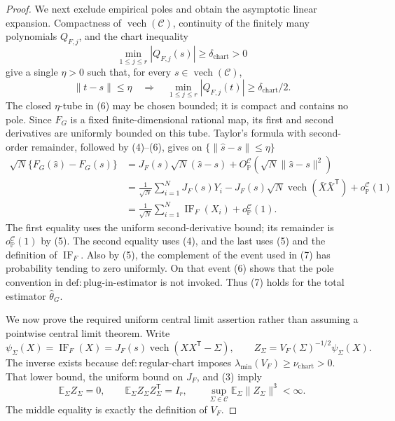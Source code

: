 \documentclass{article}
\begin{document}
\begin{proof}
We next exclude empirical poles and obtain the asymptotic linear expansion.  Compactness of \(\operatorname{vech}(\mathcal C)\), continuity of the finitely many polynomials \(Q_{F,j}\), and the chart inequality
\[
 \min_{1\le j\le r}|Q_{F,j}(s)|\ge\delta_{\mathrm{chart}}>0
\]
give a single \(\eta>0\) such that, for every \(s\in\operatorname{vech}(\mathcal C)\),
\[
 \lVert t-s\rVert\le\eta
 \quad\Longrightarrow\quad
 \min_{1\le j\le r}|Q_{F,j}(t)|\ge\delta_{\mathrm{chart}}/2.
\tag{6}
\]
The closed \(\eta\)-tube in (6) may be chosen bounded; it is compact and contains no pole.  Since \(F_G\) is a fixed finite-dimensional rational map, its first and second derivatives are uniformly bounded on this tube.  Taylor's formula with second-order remainder, followed by (4)--(6), gives on \(\{\lVert\widehat s-s\rVert\le\eta\}\)
\[
\begin{aligned}
 \sqrt N\{F_G(\widehat s)-F_G(s)\}
 &=J_F(s)\sqrt N(\widehat s-s)
   +O_{\mathbb P}^{\mathcal C}\!\left(\sqrt N\lVert\widehat s-s\rVert^2\right)\\
 &=\frac1{\sqrt N}\sum_{i=1}^N J_F(s)Y_i
   -J_F(s)\sqrt N\operatorname{vech}(\bar X\bar X^{\mathsf T})
   +o_{\mathbb P}^{\mathcal C}(1)\\
 &=\frac1{\sqrt N}\sum_{i=1}^N\operatorname{IF}_F(X_i)
   +o_{\mathbb P}^{\mathcal C}(1).
\end{aligned}
\tag{7}
\]
The first equality uses the uniform second-derivative bound; its remainder is \(o_{\mathbb P}^{\mathcal C}(1)\) by (5).  The second equality uses (4), and the last uses (5) and the definition of \(\operatorname{IF}_F\).  Also by (5), the complement of the event used in (7) has probability tending to zero uniformly.  On that event (6) shows that the pole convention in \(\mathrm{def:plug\mbox{-}in\mbox{-}estimator}\) is not invoked.  Thus (7) holds for the total estimator \(\widehat\theta_G\).

We now prove the required uniform central limit assertion rather than assuming a pointwise central limit theorem.  Write
\[
 \psi_{\Sigma}(X)=\operatorname{IF}_F(X)
 =J_F(s)\operatorname{vech}(XX^{\mathsf T}-\Sigma),
 \qquad
 Z_{\Sigma}=V_F(\Sigma)^{-1/2}\psi_{\Sigma}(X).
\]
The inverse exists because \(\mathrm{def:regular\mbox{-}chart}\) imposes
\(\lambda_{\min}(V_F)\ge\nu_{\mathrm{chart}}>0\).  That lower bound, the uniform bound on \(J_F\), and (3) imply
\[
 \mathbb E_{\Sigma}Z_{\Sigma}=0,
 \qquad
 \mathbb E_{\Sigma}Z_{\Sigma}Z_{\Sigma}^{\mathsf T}=I_r,
 \qquad
 \sup_{\Sigma\in\mathcal C}\mathbb E_{\Sigma}\lVert Z_{\Sigma}\rVert^3<\infty.
\tag{8}
\]
The middle equality is exactly the definition of \(V_F\).


\end{proof}
\end{document}
